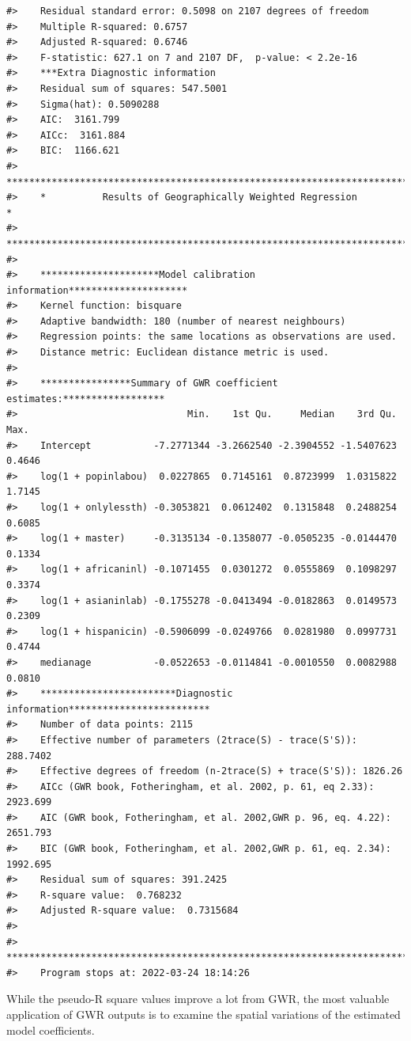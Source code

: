 \documentclass[
  11pt,
]{book}
\begin{document}
\begin{verbatim}
#>    Residual standard error: 0.5098 on 2107 degrees of freedom
#>    Multiple R-squared: 0.6757
#>    Adjusted R-squared: 0.6746 
#>    F-statistic: 627.1 on 7 and 2107 DF,  p-value: < 2.2e-16 
#>    ***Extra Diagnostic information
#>    Residual sum of squares: 547.5001
#>    Sigma(hat): 0.5090288
#>    AIC:  3161.799
#>    AICc:  3161.884
#>    BIC:  1166.621
#>    ***********************************************************************
#>    *          Results of Geographically Weighted Regression              *
#>    ***********************************************************************
#> 
#>    *********************Model calibration information*********************
#>    Kernel function: bisquare 
#>    Adaptive bandwidth: 180 (number of nearest neighbours)
#>    Regression points: the same locations as observations are used.
#>    Distance metric: Euclidean distance metric is used.
#> 
#>    ****************Summary of GWR coefficient estimates:******************
#>                              Min.    1st Qu.     Median    3rd Qu.   Max.
#>    Intercept           -7.2771344 -3.2662540 -2.3904552 -1.5407623 0.4646
#>    log(1 + popinlabou)  0.0227865  0.7145161  0.8723999  1.0315822 1.7145
#>    log(1 + onlylessth) -0.3053821  0.0612402  0.1315848  0.2488254 0.6085
#>    log(1 + master)     -0.3135134 -0.1358077 -0.0505235 -0.0144470 0.1334
#>    log(1 + africaninl) -0.1071455  0.0301272  0.0555869  0.1098297 0.3374
#>    log(1 + asianinlab) -0.1755278 -0.0413494 -0.0182863  0.0149573 0.2309
#>    log(1 + hispanicin) -0.5906099 -0.0249766  0.0281980  0.0997731 0.4744
#>    medianage           -0.0522653 -0.0114841 -0.0010550  0.0082988 0.0810
#>    ************************Diagnostic information*************************
#>    Number of data points: 2115 
#>    Effective number of parameters (2trace(S) - trace(S'S)): 288.7402 
#>    Effective degrees of freedom (n-2trace(S) + trace(S'S)): 1826.26 
#>    AICc (GWR book, Fotheringham, et al. 2002, p. 61, eq 2.33): 2923.699 
#>    AIC (GWR book, Fotheringham, et al. 2002,GWR p. 96, eq. 4.22): 2651.793 
#>    BIC (GWR book, Fotheringham, et al. 2002,GWR p. 61, eq. 2.34): 1992.695 
#>    Residual sum of squares: 391.2425 
#>    R-square value:  0.768232 
#>    Adjusted R-square value:  0.7315684 
#> 
#>    ***********************************************************************
#>    Program stops at: 2022-03-24 18:14:26
\end{verbatim}

While the pseudo-R square values improve a lot from GWR, the most valuable application of GWR outputs is to examine the spatial variations of the estimated model coefficients.
\end{document}
